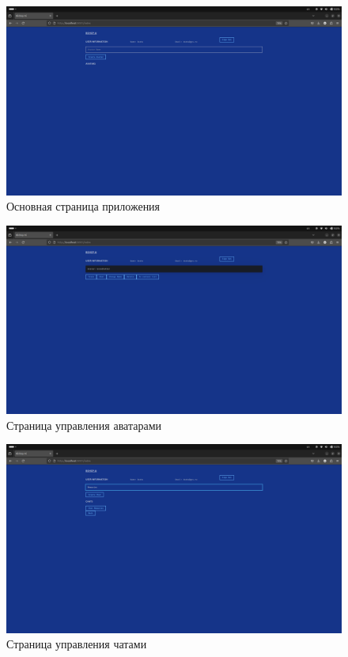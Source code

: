 \begin{figure}
    \centering
    \includegraphics[width=1.0\linewidth]{images/ui/index.png}
    \caption{Основная страница приложения}
    \label{fig:ui-page-index}
\end{figure}

\begin{figure}
    \centering
    \includegraphics[width=1.0\linewidth]{images/ui/avatar.png}
    \caption{Страница управления аватарами}
    \label{fig:ui-page-avatar}
\end{figure}

\begin{figure}
    \centering
    \includegraphics[width=1.0\linewidth]{images/ui/chat1.png}
    \caption{Страница управления чатами}
    \label{fig:ui-page-chat1}
\end{figure}

